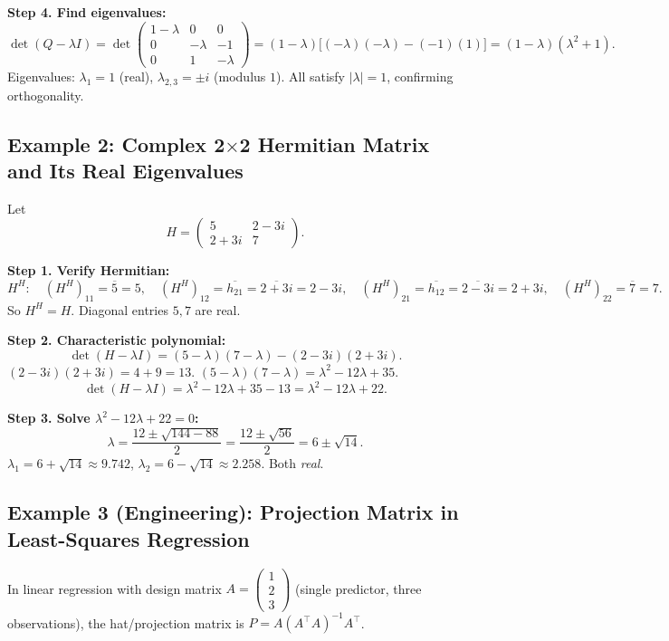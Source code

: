 \documentclass[12pt,a4paper]{article}
\begin{document}
\textbf{Step 4. Find eigenvalues:}
\[
  \det(Q - \lambda I) = \det\begin{pmatrix}
    1-\lambda & 0 & 0 \\
    0 & -\lambda & -1 \\
    0 & 1 & -\lambda
  \end{pmatrix}
  = (1-\lambda)\bigl[(-\lambda)(-\lambda) - (-1)(1)\bigr]
  = (1-\lambda)(\lambda^2 + 1).
\]
Eigenvalues: $\lambda_1 = 1$ (real), $\lambda_{2,3} = \pm i$ (modulus $1$). \quad \checkmark
All satisfy $|\lambda| = 1$, confirming orthogonality.

\subsection*{Example 2: Complex 2$\times$2 Hermitian Matrix and Its Real Eigenvalues}

Let
\[
  H = \begin{pmatrix} 5 & 2-3i \\ 2+3i & 7 \end{pmatrix}.
\]

\textbf{Step 1. Verify Hermitian:}
\[
  H^H: \quad (H^H)_{11} = \overline{5} = 5, \quad
             (H^H)_{12} = \overline{h_{21}} = \overline{2+3i} = 2-3i, \quad
             (H^H)_{21} = \overline{h_{12}} = \overline{2-3i} = 2+3i, \quad
             (H^H)_{22} = \overline{7} = 7.
\]
So $H^H = H$. \quad \checkmark Diagonal entries $5, 7$ are real.

\textbf{Step 2. Characteristic polynomial:}
\[
  \det(H - \lambda I) = (5-\lambda)(7-\lambda) - (2-3i)(2+3i).
\]
$(2-3i)(2+3i) = 4 + 9 = 13$.
$(5-\lambda)(7-\lambda) = \lambda^2 - 12\lambda + 35$.
\[
  \det(H - \lambda I) = \lambda^2 - 12\lambda + 35 - 13 = \lambda^2 - 12\lambda + 22.
\]

\textbf{Step 3. Solve $\lambda^2 - 12\lambda + 22 = 0$:}
\[
  \lambda = \frac{12 \pm \sqrt{144 - 88}}{2} = \frac{12 \pm \sqrt{56}}{2} = 6 \pm \sqrt{14}.
\]
$\lambda_1 = 6 + \sqrt{14} \approx 9.742$, $\lambda_2 = 6 - \sqrt{14} \approx 2.258$. Both \emph{real}. \quad \checkmark

\subsection*{Example 3 (Engineering): Projection Matrix in Least-Squares Regression}

In linear regression with design matrix $A = \begin{pmatrix}1\\2\\3\end{pmatrix}$ (single predictor, three observations),
the hat/projection matrix is $P = A(A^\top A)^{-1}A^\top$.
\end{document}

